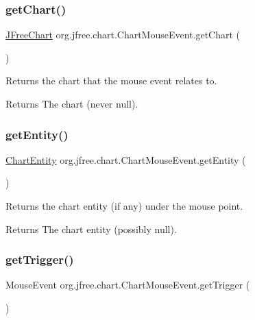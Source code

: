 \subsubsection{\texorpdfstring{get\+Chart()}{getChart()}}
{\footnotesize\ttfamily \mbox{\hyperlink{classorg_1_1jfree_1_1chart_1_1_j_free_chart}{J\+Free\+Chart}} org.\+jfree.\+chart.\+Chart\+Mouse\+Event.\+get\+Chart (\begin{DoxyParamCaption}{ }\end{DoxyParamCaption})}

Returns the chart that the mouse event relates to.

\begin{DoxyReturn}{Returns}
The chart (never {\ttfamily null}). 
\end{DoxyReturn}
\mbox{\label{classorg_1_1jfree_1_1chart_1_1_chart_mouse_event_a42d0006c4a10790cc955667c2c0b60ac}} 
\subsubsection{\texorpdfstring{get\+Entity()}{getEntity()}}
{\footnotesize\ttfamily \mbox{\hyperlink{classorg_1_1jfree_1_1chart_1_1entity_1_1_chart_entity}{Chart\+Entity}} org.\+jfree.\+chart.\+Chart\+Mouse\+Event.\+get\+Entity (\begin{DoxyParamCaption}{ }\end{DoxyParamCaption})}

Returns the chart entity (if any) under the mouse point.

\begin{DoxyReturn}{Returns}
The chart entity (possibly {\ttfamily null}). 
\end{DoxyReturn}
\mbox{\label{classorg_1_1jfree_1_1chart_1_1_chart_mouse_event_a99122c07588d5b627b887a7ec6014815}} 
\subsubsection{\texorpdfstring{get\+Trigger()}{getTrigger()}}
{\footnotesize\ttfamily Mouse\+Event org.\+jfree.\+chart.\+Chart\+Mouse\+Event.\+get\+Trigger (\begin{DoxyParamCaption}{ }\end{DoxyParamCaption})}

